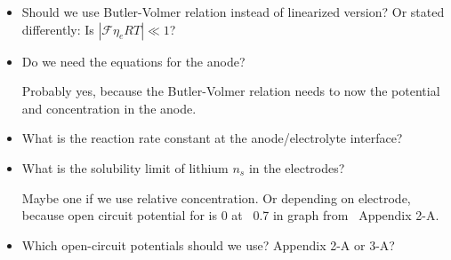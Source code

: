 \documentclass[a4paper,11pt]{scrartcl}
\newcommand*{\F}{\mathcal{F}}
\begin{document}
\begin{itemize}
\item Should we use Butler-Volmer relation instead of linearized version?
  Or stated differently: Is $|\F \eta_e R T| \ll 1$?

\item Do we need the equations for the anode?

  Probably yes, because the Butler-Volmer relation needs to now the potential
  and concentration in the anode.

\item What is the reaction rate constant at the anode/electrolyte interface?

\item What is the solubility limit of lithium $n_s$ in the electrodes?

  Maybe one if we use relative concentration. Or depending on electrode, because
  open circuit potential for  is 0 at ~0.7 in graph from~\cite{doyle95} Appendix 2-A.

\item Which open-circuit potentials should we use? Appendix 2-A or 3-A?

\end{itemize}

{}

\end{document}
